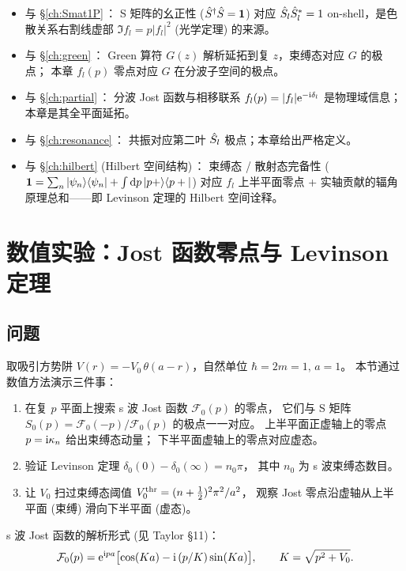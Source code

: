 \begin{remark}[与前序章节的联系]
\begin{itemize}
\item 与 \S\ref{ch:Smat1P}\,： S 矩阵的幺正性 ($\hat{S}^\dagger\hat{S}=\boldsymbol{1}$)
对应 $\hat{S}_l\hat{S}_l^*=1$ on-shell，是色散关系右割线虚部 $\Im f_l=p|f_l|^2$
(光学定理) 的来源。
\item 与 \S\ref{ch:green}\,： Green 算符 $G(z)$ 解析延拓到复 $z$，束缚态对应 $G$ 的极点；
本章 $f_l(p)$ 零点对应 $G$ 在分波子空间的极点。
\item 与 \S\ref{ch:partial}\,： 分波 Jost 函数与相移联系 $f_l(p)=|f_l|\mathrm{e}^{-\mathrm{i}\delta_l}$
是物理域信息；本章是其全平面延拓。
\item 与 \S\ref{ch:resonance}\,： 共振对应第二叶 $\hat{S}_l$ 极点；本章给出严格定义。
\item 与 \S\ref{ch:hilbert} (Hilbert 空间结构)\,： 束缚态 / 散射态完备性
($\boldsymbol{1}=\sum_n|\psi_n\rangle\langle\psi_n|+\int\mathrm{d} p\,|p+\rangle\langle p+|$)
对应 $f_l$ 上半平面零点 + 实轴贡献的辐角原理总和——即 Levinson 定理的 Hilbert
空间诠释。
\end{itemize}
\end{remark}

\section{数值实验：Jost 函数零点与 Levinson 定理}\label{sec:numexp-ch11}

\subsection*{问题}
取吸引方势阱 $V(r)=-V_0\,\theta(a-r)$，自然单位 $\hbar=2m=1,\,a=1$。
本节通过数值方法演示三件事：
\begin{enumerate}
\item 在复 $p$ 平面上搜索 s 波 Jost 函数 $\mathcal{F}_0(p)$ 的零点，
      它们与 S 矩阵 $S_0(p)=\mathcal{F}_0(-p)/\mathcal{F}_0(p)$ 的极点一一对应。
      上半平面正虚轴上的零点 $p=\mathrm{i}\kappa_n$ 给出束缚态动量；
      下半平面虚轴上的零点对应虚态。
\item 验证 Levinson 定理 $\delta_0(0)-\delta_0(\infty)=n_0\pi$，
      其中 $n_0$ 为 s 波束缚态数目。
\item 让 $V_0$ 扫过束缚态阈值 $V_0^{\rm thr}=(n+\tfrac12)^2\pi^2/a^2$，
      观察 Jost 零点沿虚轴从上半平面 (束缚) 滑向下半平面 (虚态)。
\end{enumerate}

s 波 Jost 函数的解析形式 (见 Taylor §11)：
\begin{equation}
\mathcal{F}_0(p)=\mathrm{e}^{\mathrm{i} p a}\bigl[\cos(K a)-\mathrm{i}\,(p/K)\sin(K a)\bigr],\qquad
K=\sqrt{p^2+V_0}.
\end{equation}

